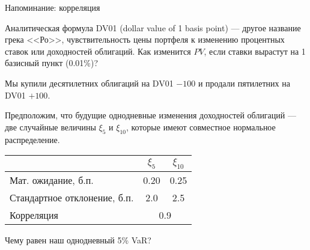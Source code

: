 \documentclass{beamer}
\begin{document}
    \newcommand{\addCovarianceSubplot}[3]{
        \nextgroupplot[
            title = {$\rho = #1$}
        ]
        \addplot[
            color = Set1-B,
            only marks
        ]
        table[
            x = #2,
            y = #3,
            col sep=comma
        ]
        {covariance_plot_random_samples.csv};
    }

\begin{frame}{Напоминание: корреляция}
\centering
{}
\end{frame}



\begin{frame}{Аналитическая формула}
\justify
DV01 (dollar value of 1 basis point) --- другое название грека <<Ро>>, чувствительность цены портфеля к изменению процентных ставок или доходностей облигаций. Как изменится $PV$, если ставки вырастут на 1 базисный пункт (0.01\%)?

\justify
Мы купили десятилетних облигаций на DV01 $-100$ и продали пятилетних на DV01 $+100$.

\justify
Предположим, что будущие однодневные изменения доходностей облигаций --- две случайные величины $\xi_5$ и $\xi_{10}$, которые имеют совместное нормальное распределение.

\justify
\centering
\begin{tabular}{l|c|c}
 & $\xi_5$ & $\xi_{10}$ \\ \hline
Мат. ожидание, б.п. & 0.20 & 0.25 \\
Стандартное отклонение, б.п. & 2.0 & 2.5 \\ \hline
Корреляция & \multicolumn{2}{c}{0.9}
\end{tabular}

\justify
Чему равен наш однодневный 5\% VaR?
\end{frame}
\end{document}

